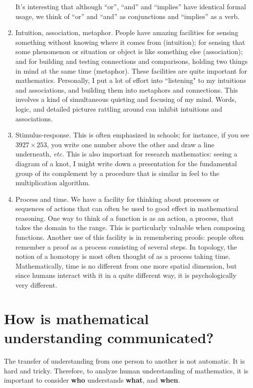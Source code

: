 \begin{enumerate}
It's interesting that although ``or'', ``and''
and ``implies'' have identical formal usage, we think of 
``or'' and ``and''
as conjunctions and ``implies'' as a verb.
\item  Intuition, association, metaphor.  People have 
amazing 
facilities for sensing something without knowing where it 
comes 
from (intuition); for sensing that some phenomenon or 
situation or 
object is like something else (association); and for 
building and testing connections 
and comparisons, holding two things in mind at the same 
time (metaphor).
These facilities are quite important for mathematics.  
Personally, I put a lot of effort into ``listening" to my 
intuitions and 
associations, and building them into metaphors and 
connections. This involves
a kind of simultaneous quieting and focusing of
my mind.  Words, logic, and detailed pictures rattling 
around can inhibit
intuitions and associations.
\item Stimulus-response.  This is often emphasized in 
schools; for instance, if you see $3927 \times 253$,  you 
write one number above the other and draw a line 
underneath, {\it etc.}
This is also important for research mathematics: seeing a 
diagram of a 
knot, I might write down a presentation for the 
fundamental group of its 
complement by a procedure that is similar in feel to the 
multiplication
algorithm.
\item  Process and time.  We have a facility for thinking 
about
processes or sequences of actions that can often be used 
to good effect 
in mathematical reasoning. One way to think of a function 
is as an 
action, a process, that takes the domain to the range.  
This is particularly
valuable when composing functions.  Another use of this 
facility is in remembering proofs:  people often remember 
a proof as a process
consisting of several steps. In topology, the notion of a 
homotopy is 
most often thought of as a process taking time.   
Mathematically, time is 
no different from one more spatial dimension, but since 
humans interact 
with it in a quite different way, it is psychologically 
very different.
\end{enumerate}

\section{How is mathematical understanding communicated?}

The transfer of understanding from one person
to another is not automatic. It is hard and tricky.
Therefore, to analyze human understanding of mathematics, 
it is
important to consider {\bf who} understands {\bf what}, 
and {\bf when}.


